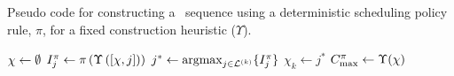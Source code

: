 \begin{algorithm}[t]
    \caption{Pseudo code for constructing a \JSP\ sequence using a 
    deterministic scheduling policy 
    rule, $\pi$, for a fixed construction heuristic ($\Upsilon$).} 
    \label{pseudo:constructJSP}
    \begin{algorithmic}[1]
        \State ${\mathbf{\chi}} \gets \emptyset$  
        \State $I_j^{\pi} \gets \pi 
        \left(\Upsilon\left([{\mathbf{\chi}},j]\right)\right)$ 
        \EndFor
        \State $j^* \gets \mathop{\rm argmax}_{j\in \mathcal{L}^{(k)}}\{I_j^{\pi}\}$ 
        \State $\chi_k \gets j^*$ 
        \EndFor
        \State \Return $C_{\max}^{\pi} \gets \Upsilon({\mathbf{\chi}})$ 
        \EndProcedure
    \end{algorithmic}
\end{algorithm}